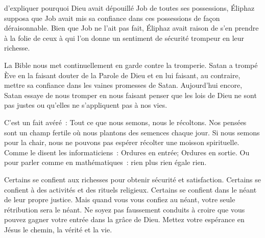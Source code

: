 \dvrule






 d'expliquer pourquoi Dieu avait dépouillé Job
 de toutes ses possessions, Éliphaz supposa que Job avait mis sa confiance
 dans ces possessions de façon déraisonnable.
 Bien que Job ne l'ait pas fait, Éliphaz avait raison de s'en prendre
 à la folie de ceux à qui l'on donne un sentiment de sécurité trompeur
 en leur richesse. 

La Bible nous met continuellement en garde contre la tromperie.
 Satan a trompé Ève en la faisant douter de la Parole de Dieu
 et en lui faisant, au contraire, mettre sa confiance dans les vaines
 promesses de Satan.
 Aujourd'hui encore, Satan essaye de nous tromper en nous faisant penser
 que les lois de Dieu ne sont pas justes ou qu'elles ne s'appliquent
 pas à nos vies. 


C'est un fait avéré~: Tout ce que nous semons, nous le récoltons.
 Nos pensées sont un champ fertile où nous plantons des semences chaque jour.
 Si nous semons pour la chair, nous ne pouvons pas espérer récolter
 une moisson spirituelle.
 Comme le disent les informaticiens~:
 \og Ordures en entrée; Ordures en sortie. \fg{}
 Ou pour parler comme en mathématiques~: rien plus rien égale rien. 

Certains se confient aux richesses pour obtenir sécurité et satisfaction.
 Certains se confient à des activités et des rituels religieux.
 Certains se confient dans le néant de leur propre justice.
 Mais quand vous vous confiez au néant, votre seule rétribution sera le néant.
 Ne soyez pas faussement conduits à croire que vous pouvez gagner
 votre entrée dans la grâce de Dieu.
 Mettez votre espérance en Jésus \ocadr{}le chemin, la vérité et la vie.

\dvrule


